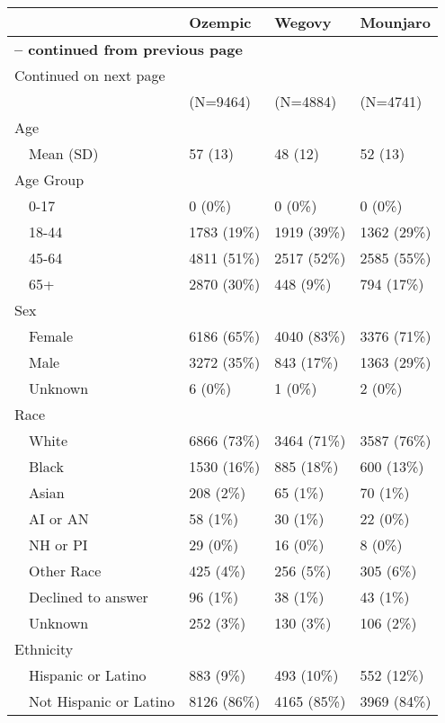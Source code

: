 \begin{longtable}{p{}p{}p{}p{}}
   & Ozempic & Wegovy & Mounjaro \\ 
  \hline 
\endfirsthead 
\multicolumn{4}{p{\textwidth}}{{ \bfseries \tablename \thetable{} -- continued from previous page}} \ 
\hline Feature & Ozempic & Wegovy & Moujaro\\ \hline 
\endhead 
\hline \multicolumn{4}{p{\textwidth}}{{Continued on next page}} \\ \hline 
\endfoot 
\hline 
\endlastfoot 
 \hline
 & (N=9464) & (N=4884) & (N=4741) \\ 
  Age &  &  &  \\ 
    Mean (SD) & 57 (13) & 48 (12) & 52 (13) \\ 
  Age Group &  &  &  \\ 
    0-17 & 0 (0\%) & 0 (0\%) & 0 (0\%) \\ 
    18-44 & 1783 (19\%) & 1919 (39\%) & 1362 (29\%) \\ 
    45-64 & 4811 (51\%) & 2517 (52\%) & 2585 (55\%) \\ 
    65+ & 2870 (30\%) & 448 (9\%) & 794 (17\%) \\ 
  Sex &  &  &  \\ 
    Female & 6186 (65\%) & 4040 (83\%) & 3376 (71\%) \\ 
    Male & 3272 (35\%) & 843 (17\%) & 1363 (29\%) \\ 
    Unknown & 6 (0\%) & 1 (0\%) & 2 (0\%) \\ 
  Race &  &  &  \\ 
    White & 6866 (73\%) & 3464 (71\%) & 3587 (76\%) \\ 
    Black & 1530 (16\%) & 885 (18\%) & 600 (13\%) \\ 
    Asian & 208 (2\%) & 65 (1\%) & 70 (1\%) \\ 
    AI or AN & 58 (1\%) & 30 (1\%) & 22 (0\%) \\ 
    NH or PI & 29 (0\%) & 16 (0\%) & 8 (0\%) \\ 
    Other Race & 425 (4\%) & 256 (5\%) & 305 (6\%) \\ 
    Declined to answer & 96 (1\%) & 38 (1\%) & 43 (1\%) \\ 
    Unknown & 252 (3\%) & 130 (3\%) & 106 (2\%) \\ 
  Ethnicity &  &  &  \\ 
    Hispanic or Latino & 883 (9\%) & 493 (10\%) & 552 (12\%) \\ 
    Not Hispanic or Latino & 8126 (86\%) & 4165 (85\%) & 3969 (84\%) \\ 

\end{longtable}
